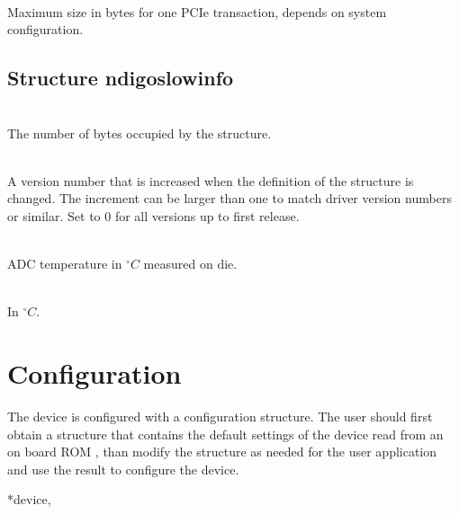 			\\
			Maximum size in bytes for one PCIe transaction, depends on system configuration.\par
		
		\subsection{Structure ndigo\tu slow\tu info}
		
			\\
			The number of bytes occupied by the structure.\par

			\\
			A version number that is increased when the definition of the structure is changed. The increment can be larger than one to match driver version numbers or similar. Set to 0 for all versions up to
first release.\par

			\\
			ADC temperature in $^{\circ}C$ measured on die.\par

			\\
			In $^{\circ}C$.
		
	\section{Configuration}
	
		The device is configured with a configuration structure. The user should first obtain a structure that contains the default settings of the device read from an on board ROM , than modify the structure as needed for the user application and use the result to configure the device.\par

		 \par

		 \par
		
		 {*device,} \par

